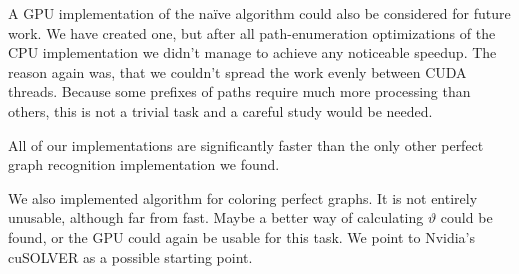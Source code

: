 A GPU implementation of the na\"ive algorithm could also be considered for future work. We have created one, but after all path-enumeration optimizations of the CPU implementation we didn't manage to achieve any noticeable speedup. The reason again was, that we couldn't spread the work evenly between CUDA threads. Because some prefixes of paths require much more processing than others, this is not a trivial task and a careful study would be needed.

All of our implementations are significantly faster than the only other perfect graph recognition implementation we found.

We also implemented algorithm for coloring perfect graphs. It is not entirely unusable, although far from fast. Maybe a better way of calculating $\vartheta$ could be found, or the GPU could again be usable for this task. We point to Nvidia's cuSOLVER  \cite{cusolver} as a possible starting point.